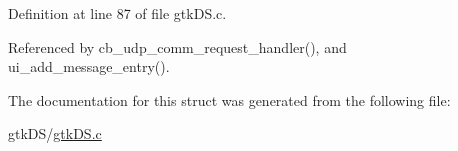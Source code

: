 Definition at line 87 of file gtk\+D\+S.\+c.



Referenced by cb\+\_\+udp\+\_\+comm\+\_\+request\+\_\+handler(), and ui\+\_\+add\+\_\+message\+\_\+entry().



The documentation for this struct was generated from the following file\+:\begin{DoxyCompactItemize}
\item 
gtk\+D\+S/\hyperlink{gtk_d_s_8c}{gtk\+D\+S.\+c}\end{DoxyCompactItemize}
